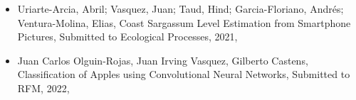 \begin{itemize} 
\item Uriarte-Arcia, Abril; Vasquez, Juan; Taud, Hind; Garcia-Floriano, Andrés; Ventura-Molina, Elias, Coast Sargassum Level Estimation from Smartphone Pictures, Submitted to Ecological Processes, 2021, \href{https://arxiv.org/abs/3939932}{\faFilePdfO} 
\item Juan Carlos Olguin-Rojas, Juan Irving Vasquez, Gilberto Castens, Classification of Apples using Convolutional Neural Networks, Submitted to RFM, 2022, \href{}{\faFilePdfO} 
\end{itemize} 
